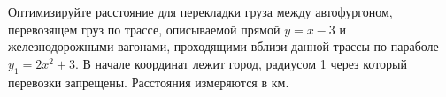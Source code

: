 
Оптимизируйте расстояние для перекладки груза между автофургоном, перевозящем груз по трассе, описываемой 
прямой $y=x-3$ и железнодорожными вагонами, проходящими вблизи данной трассы по параболе $y_1=2x^{2}+3$. 
В начале координат лежит город, радиусом 1 через который перевозки запрещены. Расстояния измеряются в км. 
